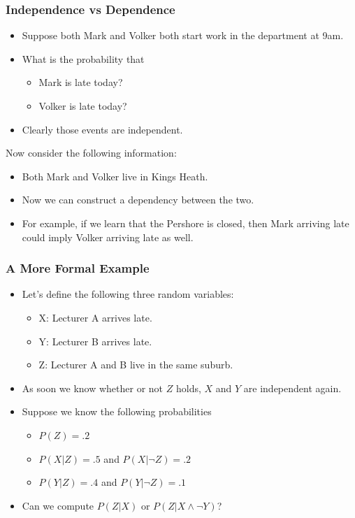 \documentclass[xcolor=dvipsnames,ignorenonframetext]{beamer}
\begin{document}
\begin{frame}
  \frametitle{Independence vs Dependence}
  \begin{itemize}
  \item Suppose both Mark and Volker both start work in the department at 9am.
  \item What is the probability that
    \begin{itemize}
    \item Mark is late today?
    \item Volker is late today?
    \end{itemize}
  \item Clearly those events are independent.
  \end{itemize}
  Now consider the following information:
  \begin{itemize}
  \item Both Mark and Volker live in Kings Heath.
  \item Now we can construct a dependency between the two.
  \item For example, if we learn that the Pershore is closed, then Mark arriving
    late could imply Volker arriving late as well.
  \end{itemize}
\end{frame}

\begin{frame}
  \frametitle{A More Formal Example}
  \begin{itemize}
  \item Let's define the following three random variables:
    \begin{itemize}
    \item X: Lecturer A arrives late.
    \item Y: Lecturer B arrives late.
    \item Z: Lecturer A and B live in the same suburb.
    \end{itemize}
  \item As soon we know whether or not $Z$ holds, $X$ and $Y$ are independent
    again.
  \end{itemize}
  \begin{itemize}
  \item Suppose we know the following probabilities
    \begin{itemize}
    \item $P(Z)=.2$
    \item $P(X|Z) = .5$ and $P(X|\neg Z)=.2$
    \item $P(Y|Z) = .4$ and $P(Y|\neg Z)=.1$
    \end{itemize}
  \item Can we compute $P(Z|X)$ or $P(Z|X\wedge \neg Y)$?
  \end{itemize}
\end{frame}
\end{document}
